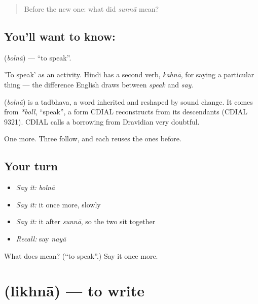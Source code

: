 \label{lesson:HI-C43-speak}



\begin{quote}
Before the new one: what did \emph{sunnā} mean?
\end{quote}

\subsection*{You'll want to know: }
\textbf{} (\emph{bolnā}) — \textquotedblleft{}to speak\textquotedblright{}.

'To speak' as an activity. Hindi has a second verb, \emph{kahnā}, for saying a particular thing — the difference English draws between \emph{speak} and \emph{say}.

\begin{cousinweb}
\textbf{} (\emph{bolnā}) is a tadbhava, a word inherited and reshaped by sound change. It comes from \emph{*boll}, \textquotedblleft{}speak\textquotedblright{}, a form CDIAL reconstructs from its descendants (CDIAL 9321). CDIAL calls a borrowing from Dravidian very doubtful.
\end{cousinweb}

\begin{grammarlens}[title={What you've built}]
One more. Three follow, and each reuses the ones before.
\end{grammarlens}

\subsection*{Your turn}
\begin{itemize}
\raggedright
  \item \emph{Say it:} \emph{bolnā}
  \item \emph{Say it:} it once more, slowly
  \item \emph{Say it:} it after \emph{sunnā}, so the two sit together
  \item \emph{Recall:} say \emph{nayā}
\end{itemize}

\begin{tcolorbox}[breakable,colback=teal!4,colframe=teal!35!black,title={Before you move on}]
What does  mean? (\textquotedblleft{}to speak\textquotedblright{}.) Say it once more.
\end{tcolorbox}
\section[\texorpdfstring{\hi{लिखना} (likhnā)}{लिखना (likhnā)}]{ (likhnā) — to write}

